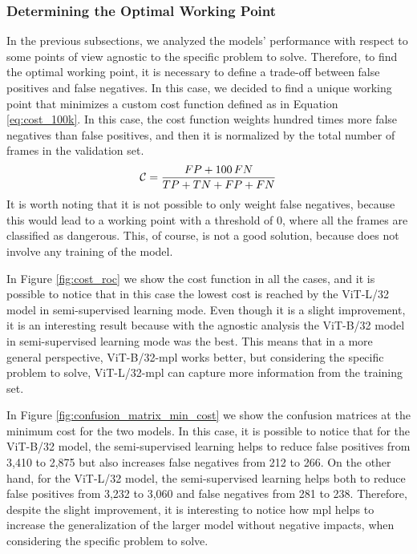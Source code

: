 \subsubsection{Determining the Optimal Working Point}
In the previous subsections, we analyzed the models' performance with respect to 
some points of view agnostic to the specific problem to solve. Therefore, to find 
the optimal working point, it is necessary to define a trade-off between false 
positives and false negatives. In this case, we decided to find a unique working 
point that minimizes a custom cost function defined as in Equation \ref{eq:cost_100k}.
In this case, the cost function weights hundred times more false negatives than 
false positives, and then it is normalized by the total number of frames in the 
validation set.
\begin{equation}
    \centering
    \mathcal{C} = \frac{FP + 100 \, FN}{TP + TN + FP + FN}
    \label{eq:cost_100k}
\end{equation}
It is worth noting that it is not possible to only weight false negatives, because 
this would lead to a working point with a threshold of 0, where all the frames 
are classified as dangerous. This, of course, is not a good solution, because 
does not involve any training of the model.

In Figure \ref{fig:cost_roc} we show the cost function in all the cases, and it 
is possible to notice that in this case the lowest cost is reached by the ViT-L/32 
model in semi-supervised learning mode. Even though it is a slight improvement, 
it is an interesting result because with the agnostic analysis the ViT-B/32 model 
in semi-supervised learning mode was the best. This means that in a more general 
perspective, ViT-B/32-\acs{mpl} works better, but considering the specific problem 
to solve, ViT-L/32-\acs{mpl} can capture more information from the training set.

In Figure \ref{fig:confusion_matrix_min_cost} we show the confusion matrices 
at the minimum cost for the two models. In this case, it is possible to notice 
that for the ViT-B/32 model, the semi-supervised learning helps to reduce false 
positives from 3,410 to 2,875 but also increases false negatives from 212 to 
266. On the other hand, for the ViT-L/32 model, the semi-supervised learning 
helps both to reduce false positives from 3,232 to 3,060 and false negatives 
from 281 to 238. Therefore, despite the slight improvement, it is interesting to 
notice how \acl{mpl} helps to increase the generalization of the larger model 
without negative impacts, when considering the specific problem to solve.

